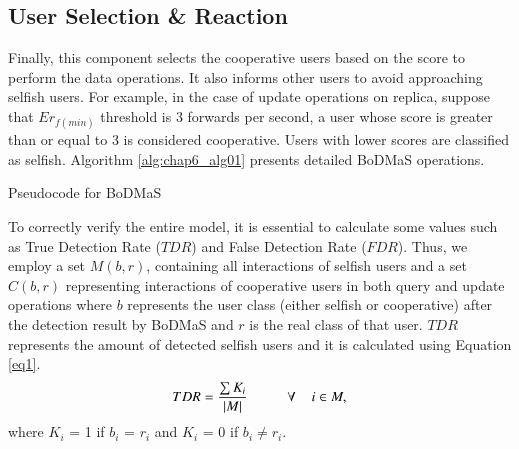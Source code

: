 \subsection{User Selection \& Reaction}\label{Chap6_04_04}
Finally, this component selects the cooperative users based on the score to perform the data operations. It also informs other users to avoid approaching selfish users. For example, in the case of update operations on replica, suppose that $Er_{f(min)}$ threshold is 3 forwards per second, a user whose score is greater than or equal to 3 is considered cooperative. Users with lower scores are classified as selfish. Algorithm \ref{alg:chap6_alg01} presents detailed BoDMaS operations.
\begin{algorithm}
\caption{Pseudocode for BoDMaS}
\label{alg:chap6_alg01}
\end{algorithm}

To correctly verify the entire model, it is essential to calculate some values such as True Detection Rate ($TDR$) and False Detection Rate ($FDR$). Thus, we employ a set $M(b,r)$, containing all interactions of selfish users and a set $C(b,r)$ representing interactions of cooperative users in both query and update operations where $b$ represents the user class (either selfish or cooperative) after the detection result by BoDMaS and $r$ is the real class of that user. $TDR$ represents the amount of detected selfish users and it is calculated using Equation \ref{eq1}.
\begin{equation}\label{eq1}
TDR = \frac{\sum K_i}{|M|}  \hspace{1cm} \forall \hspace{0.4cm}i \in M,
\end{equation}
where $K_i$ = 1 if $b_i$ = $r_i$ and $K_i$ = 0 if $b_i \neq r_i$.

